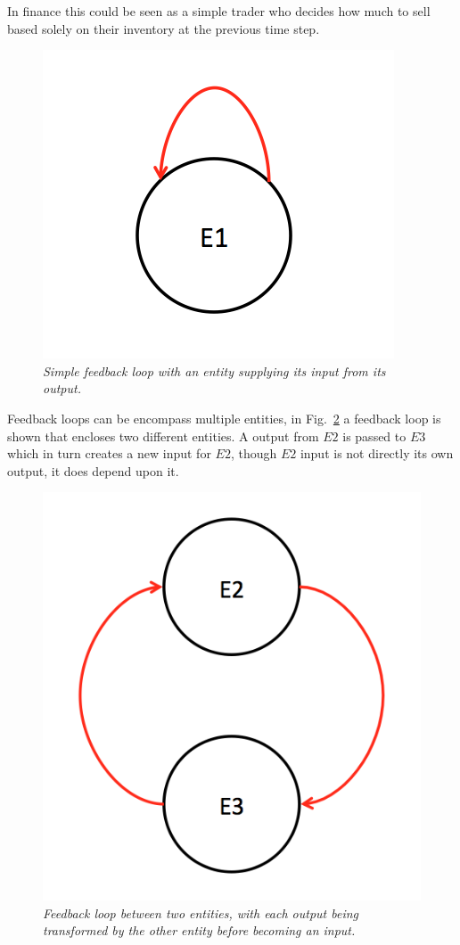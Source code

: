\documentclass{article}
\begin{document}
In finance this could be seen as a simple trader who decides how much to sell based solely on their inventory at the previous time step. 
\begin{figure}[H]
	\centering
	\includegraphics[scale=0.5]{selffeedback}
	\caption{\it Simple feedback loop with an entity supplying its input from its output.}
	\label{fig:exampleselffeedback}
\end{figure} 
Feedback loops can be encompass multiple entities, in Fig.~\ref{fig:exampletwofeedback} a feedback loop is shown that encloses two different entities. A output from $E2$ is passed to $E3$ which in turn creates a new input for $E2$, though $E2$ input is not directly its own output, it does depend upon it. 
\begin{figure}[H]
	\centering
	\includegraphics[scale=0.5]{twofeedback}
	\caption{\it Feedback loop between two entities, with each output being transformed by the other entity before becoming an input.}
	\label{fig:exampletwofeedback}
\end{figure} 
\end{document}
